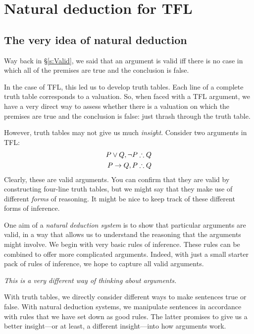 \part{Natural deduction for TFL}
\label{ch.NDTFL}

\chapter{The very idea of natural deduction}\label{s:NDVeryIdea}

Way back in \S\ref{s:Valid}, we said that an argument is valid iff there is no case in which all of the premises are true and the conclusion is false.

In the case of TFL, this led us to develop truth tables. Each line of a complete truth table corresponds to a valuation. So, when faced with a TFL argument, we have a very direct way to assess whether there is a valuation on which the premises are true and the conclusion is false: just thrash through the truth table.

However, truth tables may not give us much \emph{insight}. Consider two arguments in TFL:
\begin{align*}
P \eor Q, \enot P & \therefore Q\\
P \eif Q, P & \therefore Q
\end{align*}
Clearly, these are valid arguments. You can confirm that they are valid by constructing four-line truth tables, but we might say that they make use of different \emph{forms} of reasoning. It might be nice to keep track of these different forms of inference.

One aim of a \emph{natural deduction system} is to show that particular arguments are valid, in a way that allows us to understand the reasoning that the arguments might involve. We begin with very basic rules of inference. These rules can be combined to offer more complicated arguments. Indeed, with just a small starter pack of rules of inference, we hope to capture all valid arguments.

\emph{This is a very different way of thinking about arguments.} 

With truth tables, we directly consider different ways to make sentences true or false. With natural deduction systems, we manipulate sentences in accordance with rules that we have set down as good rules. The latter promises to give us a better insight---or at least, a different insight---into how arguments work.

